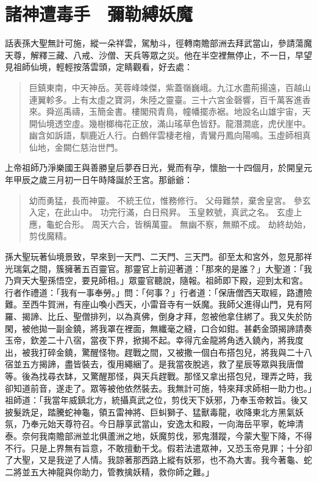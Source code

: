
\chapter{諸神遭毒手　彌勒縛妖魔}

話表孫大聖無計可施，縱一朵祥雲，駕觔斗，徑轉南贍部洲去拜武當山，參請蕩魔天尊，解釋三藏、八戒、沙僧、天兵等眾之災。他在半空裡無停止，不一日，早望見祖師仙境，輕輕按落雲頭，定睛觀看，好去處：
\begin{quote}
巨鎮東南，中天神岳。芙蓉峰竦傑，紫蓋嶺巍峨。九江水盡荊揚遠，百越山連翼軫多。上有太虛之寶洞，朱陸之靈臺。三十六宮金磬響，百千萬客進香來。舜巡禹禱，玉簡金書。樓閣飛青鳥，幢幡擺赤裾。地設名山雄宇宙，天開仙境透空虛。幾樹榔梅花正放，滿山瑤草色皆舒。龍潛澗底，虎伏崖中。幽含如訴語，馴鹿近人行。白鶴伴雲棲老檜，青鸞丹鳳向陽鳴。玉虛師相真仙地，金闕仁慈治世門。
\end{quote}

上帝祖師乃淨樂國王與善勝皇后夢吞日光，覺而有孕，懷胎一十四個月，於開皇元年甲辰之歲三月初一日午時降誕於王宮。那爺爺：
\begin{quote}
幼而勇猛，長而神靈。
不統王位，惟務修行。
父母難禁，棄舍皇宮。
參玄入定，在此山中。
功完行滿，白日飛昇。
玉皇敕號，真武之名。
玄虛上應，龜蛇合形。
周天六合，皆稱萬靈。
無幽不察，無顯不成。
劫終劫始，剪伐魔精。
\end{quote}

孫大聖玩著仙境景致，早來到一天門、二天門、三天門。卻至太和宮外，忽見那祥光瑞氣之間，簇擁著五百靈官。那靈官上前迎著道：「那來的是誰？」大聖道：「我乃齊天大聖孫悟空，要見師相。」眾靈官聽說，隨報。祖師即下殿，迎到太和宮。行者作禮道：「我有一事奉勞。」問：「何事？」行者道：「保唐僧西天取經，路遭險難。至西牛賀洲，有座山喚小西天，小雷音寺有一妖魔。我師父進得山門，見有阿羅、揭諦、比丘、聖僧排列，以為真佛，倒身才拜，忽被他拿住綁了。我又失於防閑，被他拋一副金鐃，將我罩在裡面，無纖毫之縫，口合如鉗。甚虧金頭揭諦請奏玉帝，欽差二十八宿，當夜下界，掀揭不起。幸得亢金龍將角透入鐃內，將我度出，被我打碎金鐃，驚醒怪物。趕戰之間，又被撒一個白布搭包兒，將我與二十八宿並五方揭諦，盡皆裝去，復用繩綑了。是我當夜脫逃，救了星辰等眾與我唐僧等。後為找尋衣缽，又驚醒那怪，與天兵趕戰。那怪又拿出搭包兒，理弄之時，我卻知道前音，遂走了。眾等被他依然裝去。我無計可施，特來拜求師相一助力也。」祖師道：「我當年威鎮北方，統攝真武之位，剪伐天下妖邪，乃奉玉帝敕旨。後又披髮跣足，踏騰蛇神龜，領五雷神將、巨虯獅子、猛獸毒龍，收降東北方黑氣妖氛，乃奉元始天尊符召。今日靜享武當山，安逸太和殿，一向海岳平寧，乾坤清泰。奈何我南贍部洲並北俱蘆洲之地，妖魔剪伐，邪鬼潛蹤，今蒙大聖下降，不得不行。只是上界無有旨意，不敢擅動干戈。假若法遣眾神，又恐玉帝見罪；十分卻了大聖，又是我逆了人情。我諒著那西路上縱有妖邪，也不為大害。我今著龜、蛇二將並五大神龍與你助力，管教擒妖精，救你師之難。」

